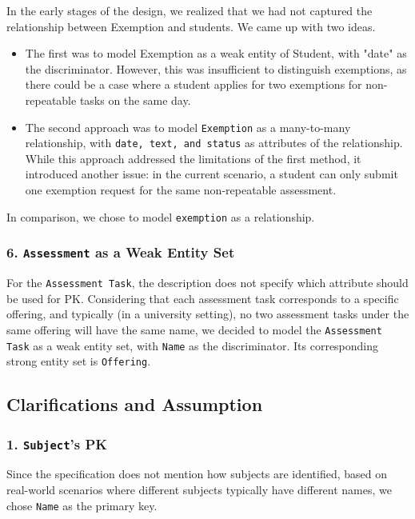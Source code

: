 \documentclass[12pt]{article}
\begin{document}
In the early stages of the design, we realized that we had not captured the relationship between Exemption and students. We came up with two ideas. 
    \begin{itemize}
        \item The first was to model Exemption as a weak entity of Student, with "date" as the discriminator. However, this was insufficient to distinguish exemptions, as there could be a case where a student applies for two exemptions for non-repeatable tasks on the same day.

        \item The second approach was to model \texttt{Exemption} as a many-to-many relationship, with \texttt{date, text, and status} as attributes of the relationship. While this approach addressed the limitations of the first method, it introduced another issue: in the current scenario, a student can only submit one exemption request for the same non-repeatable assessment.
    \end{itemize}
In comparison, we chose to model \texttt{exemption} as a relationship.

\subsubsection*{6. \texttt{Assessment} as a Weak Entity Set}

For the \texttt{Assessment Task}, the description does not specify which attribute should be used for PK. Considering that each assessment task corresponds to a specific offering, and typically (in a university setting), no two assessment tasks under the same offering will have the same name, we decided to model the \texttt{Assessment Task} as a weak entity set, with \texttt{Name} as the discriminator. Its corresponding strong entity set is \texttt{Offering}.

\subsection*{Clarifications and Assumption}

\subsubsection*{1. \texttt{Subject}'s PK}
Since the specification does not mention how subjects are identified, based on real-world scenarios where different subjects typically have different names, we chose \texttt{Name} as the primary key.
\end{document}
